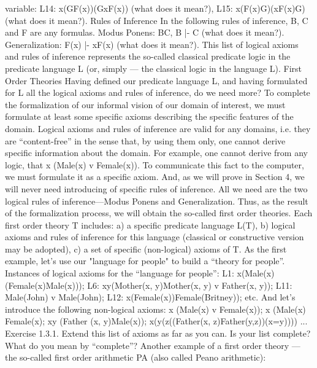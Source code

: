 variable:
L14: \forall x(G\IMPLIES F(x))\IMPLIES (G\IMPLIES \forall xF(x)) (what does it mean?),
L15: \forall x(F(x)\IMPLIES G)\IMPLIES (\exists xF(x)\IMPLIES G) (what does it mean?).
Rules of Inference
In the following rules of inference, B, C and F are any formulas.
Modus Ponens: B\IMPLIES C, B |- C (what does it mean?).
Generalization: F(x) |- \forall xF(x) (what does it mean?).
This list of logical axioms and rules of inference represents the so-called classical predicate logic in the
predicate language L (or, simply --- the classical logic in the language L).
First Order Theories
Having defined our predicate language L, and having formulated for L all the logical axioms and rules of
inference, do we need more?
To complete the formalization of our informal vision of our domain of interest, we must formulate at least
some specific axioms describing the specific features of the domain. Logical axioms and rules of
inference are valid for any domains, i.e. they are ``content-free'' in the sense that, by using them only, one
cannot derive specific information about the domain.
For example, one cannot derive from any logic, that \forall x (Male(x) v Female(x)). To communicate this fact
to the computer, we must formulate it as a specific axiom.
And, as we will prove in Section 4, we will never need introducing of specific rules of inference. All we
need are the two logical rules of inference---Modus Ponens and Generalization.
Thus, as the result of the formalization process, we will obtain the so-called first order theories.
Each first order theory T includes:
a) a specific predicate language L(T),
b) logical axioms and rules of inference for this language (classical or constructive version may be
adopted),
c) a set of specific (non-logical) axioms of T.
As the first example, let's use our "language for people" to build a ``theory for people''.
Instances of logical axioms for the ``language for people'':
L1: \forall x(Male(x)\IMPLIES (Female(x)\IMPLIES Male(x)));
L6: \forall x\forall y(Mother(x, y)\IMPLIES Mother(x, y) v Father(x, y));
L11: Male(John) v \neg Male(John);
L12: \forall x(Female(x))\IMPLIES Female(Britney));
etc.
And let's introduce the following non-logical axioms:
\forall x (Male(x) v Female(x));
\forall x \neg (Male(x) \AND  Female(x);
\forall x\forall y (Father (x, y)\IMPLIES Male(x));
\forall x(\forall y(\forall z((Father(x, z)\AND Father(y,z))\IMPLIES (x=y)))) ...
Exercise 1.3.1. Extend this list of axioms as far as you can. Is your list complete? What do you mean by ``complete''?
Another example of a first order theory --- the so-called first order arithmetic PA (also called Peano arithmetic):
